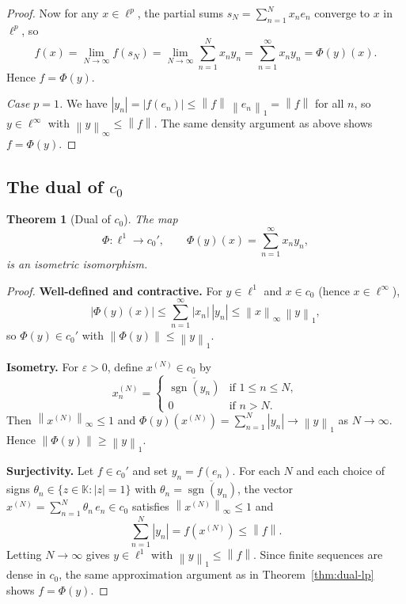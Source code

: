 \documentclass[a4paper,12pt]{book}
\DeclareMathOperator{\sgn}{sgn}
\newcommand{\K}{\mathbb{K}}
\newcommand{\norm}[1]{\left\| #1 \right\|}
\theoremstyle{definition}
\theoremstyle{plain}
\newtheorem{theorem}[definition]{Theorem}
\theoremstyle{remark}
\begin{document}
\begin{proof}
Now for any $x\in\ell^p$, the partial sums $s_N = \sum_{n=1}^N x_n e_n$
converge to $x$ in $\ell^p$, so
\[
  f(x) = \lim_{N\to\infty} f(s_N) = \lim_{N\to\infty} \sum_{n=1}^N x_n y_n
  = \sum_{n=1}^\infty x_n y_n = \Phi(y)(x).
\]
Hence $f = \Phi(y)$.

\emph{Case $p=1$.}
We have $|y_n| = |f(e_n)| \le \norm{f}\,\norm{e_n}_1 = \norm{f}$ for all $n$,
so $y\in\ell^\infty$ with $\norm{y}_\infty\le\norm{f}$.  The same density
argument as above shows $f = \Phi(y)$.
\end{proof}

\subsection{The dual of \texorpdfstring{$c_0$}{c0}}

\begin{theorem}[{Dual of $c_0$}]\label{thm:dual-c0}
The map
\[
  \Phi: \ell^1 \longrightarrow c_0',
  \qquad \Phi(y)(x) = \sum_{n=1}^\infty x_n y_n,
\]
is an isometric isomorphism.
\end{theorem}

\begin{proof}
\textbf{Well-defined and contractive.}
For $y\in\ell^1$ and $x\in c_0$ (hence $x\in\ell^\infty$),
\[
  \bigl|\Phi(y)(x)\bigr| \le \sum_{n=1}^\infty |x_n|\,|y_n|
  \le \norm{x}_\infty\,\norm{y}_1,
\]
so $\Phi(y)\in c_0'$ with $\norm{\Phi(y)}\le\norm{y}_1$.

\medskip\noindent\textbf{Isometry.}
For $\varepsilon>0$, define $x^{(N)}\in c_0$ by
\[
  x^{(N)}_n = \begin{cases}
    \overline{\sgn(y_n)} & \text{if } 1\le n\le N, \\
    0 & \text{if } n > N.
  \end{cases}
\]
Then $\norm{x^{(N)}}_\infty \le 1$ and $\Phi(y)(x^{(N)}) = \sum_{n=1}^N |y_n|
\to \norm{y}_1$ as $N\to\infty$.  Hence $\norm{\Phi(y)} \ge \norm{y}_1$.

\medskip\noindent\textbf{Surjectivity.}
Let $f\in c_0'$ and set $y_n = f(e_n)$.  For each $N$ and each choice of
signs $\theta_n\in\{z\in\K : |z|=1\}$ with $\theta_n = \overline{\sgn(y_n)}$,
the vector $x^{(N)} = \sum_{n=1}^N \theta_n\,e_n \in c_0$ satisfies
$\norm{x^{(N)}}_\infty \le 1$ and
\[
  \sum_{n=1}^N |y_n| = f(x^{(N)}) \le \norm{f}.
\]
Letting $N\to\infty$ gives $y\in\ell^1$ with $\norm{y}_1\le\norm{f}$.
Since finite sequences are dense in $c_0$,
the same approximation argument as in Theorem~\ref{thm:dual-lp} shows $f=\Phi(y)$.
\end{proof}
\end{document}
